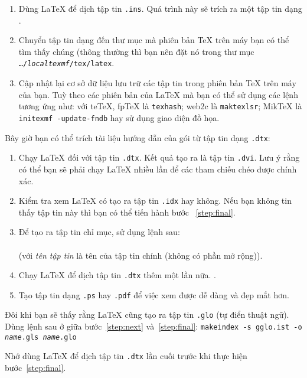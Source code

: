 \begin{enumerate}
\item Dùng \LaTeX{} để dịch tập tin \texttt{.ins}. Quá trình này sẽ trích ra một tập tin dạng .
\item Chuyển tập tin dạng  đến thư mục mà phiên bản \TeX{} trên máy bạn có thể tìm thấy chúng (thông thường thì bạn nên đặt nó trong thư mục \texttt{\ldots/\emph{localtexmf}/tex/latex}.
\item Cập nhật lại cơ sở dữ liệu lưu trữ các tập tin trong phiên bản \TeX{} trên máy của bạn. Tuỳ theo các phiên bản của \LaTeX{} mà bạn có thể sử dụng các lệnh tương ứng như: với teTeX, fpTeX là \texttt{texhash}; web2c là
\texttt{maktexlsr}; MikTeX là \texttt{initexmf -update-fndb} hay sử dụng giao diện đồ họa.
\end{enumerate}

\noindent Bây giờ bạn có thể trích tài liệu hướng dẫn của gói từ tập tin dạng \texttt{.dtx}:

\begin{enumerate}
\item Chạy \LaTeX{} đối với tập tin \texttt{.dtx}. Kết quả tạo ra là tập tin \texttt{.dvi}. Lưu ý rằng có thể bạn sẽ phải chạy
\LaTeX{} nhiều lần để các tham chiếu chéo được chính xác. 
\item Kiểm tra xem \LaTeX{} có tạo ra tập tin \texttt{.idx} hay không. Nếu bạn không tin thấy tập tin này thì bạn có thể tiến hành bước ~\ref{step:final}.
\item Để tạo ra tập tin chỉ mục, sử dụng lệnh sau:\\
\\
(với \textit{tên tập tin} là tên của tập tin chính (không có phần mở rộng)).
\item Chạy \LaTeX{} để dịch tập tin \texttt{.dtx} thêm một lần nữa. \label{step:next}.
\item Tạo tập tin dạng \texttt{.ps} hay \texttt{.pdf} để việc xem được dễ dàng và đẹp mắt hơn.\label{step:final}
\end{enumerate}

Đôi khi bạn sẽ thấy rằng \LaTeX{} cũng tạo ra tập tin \texttt{.glo} (tự điển thuật ngữ). Dùng lệnh sau ở giữa
bước~\ref{step:next} và~\ref{step:final}: \noindent\texttt{makeindex -s gglo.ist -o \textit{name}.gls
\textit{name}.glo}

\noindent Nhớ dùng \LaTeX{} để dịch tập tin \texttt{.dtx} lần cuối trước khi thực hiện bước~\ref{step:final}.



